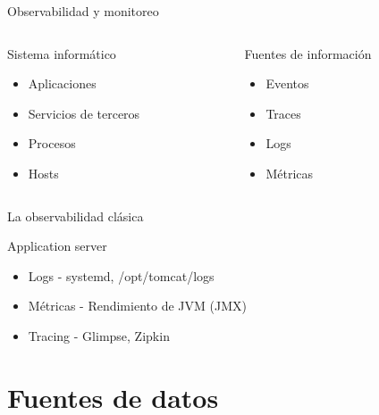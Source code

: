 \documentclass[aspectratio=169]{beamer}
\begin{document}
	\begin{frame}{Observabilidad y monitoreo}
		
		\begin{columns}
			
			\begin{column}{0.5\textwidth}
				Sistema informático {\Huge \faServer}
				\begin{itemize}
					\item Aplicaciones
					\item Servicios de terceros
					\item Procesos
					\item Hosts
				\end{itemize}
			\end{column}
			
			\begin{column}{0.5\textwidth}
				Fuentes de información {\Huge	 \faBinoculars}
				\begin{itemize}
					\item Eventos
					\item Traces
					\item Logs
					\item Métricas
				\end{itemize}
			\end{column}
		\end{columns}
		
	\end{frame}
	
	\begin{frame}{La observabilidad clásica}
		
		Application server
		\begin{itemize}
			\item Logs - systemd, /opt/tomcat/logs
			\item Métricas - Rendimiento de JVM (JMX)
			\item Tracing - Glimpse, Zipkin
		\end{itemize}
		
	\end{frame}
	
	{
		\section{Fuentes de datos}
	}
	
\end{document}
